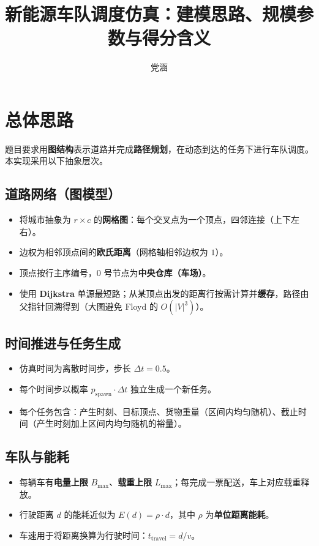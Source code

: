\documentclass[UTF8,a4paper]{ctexart}
\title{新能源车队调度仿真：建模思路、规模参数与得分含义}
\author{党涵}
\date{}
\begin{document}
\maketitle

\section{总体思路}

题目要求用\textbf{图结构}表示道路并完成\textbf{路径规划}，在动态到达的任务下进行车队调度。本实现采用以下抽象层次。

\subsection{道路网络（图模型）}
\begin{itemize}
  \item 将城市抽象为 $r\times c$ 的\textbf{网格图}：每个交叉点为一个顶点，四邻连接（上下左右）。
  \item 边权为相邻顶点间的\textbf{欧氏距离}（网格轴相邻边权为 $1$）。
  \item 顶点按行主序编号，$0$ 号节点为\textbf{中央仓库（车场）}。
  \item 使用 \textbf{Dijkstra} 单源最短路；从某顶点出发的距离行按需计算并\textbf{缓存}，路径由父指针回溯得到（大图避免 Floyd 的 $O(|V|^3)$）。
\end{itemize}

\subsection{时间推进与任务生成}
\begin{itemize}
  \item 仿真时间为离散时间步，步长 $\Delta t = 0.5$。
  \item 每个时间步以概率 $p_{\mathrm{spawn}} \cdot \Delta t$ 独立生成一个新任务。
  \item 每个任务包含：产生时刻、目标顶点、货物重量（区间内均匀随机）、截止时间（产生时刻加上区间内均匀随机的裕量）。
\end{itemize}

\subsection{车队与能耗}
\begin{itemize}
  \item 每辆车有\textbf{电量上限} $B_{\max}$、\textbf{载重上限} $L_{\max}$；每完成一票配送，车上对应载重释放。
  \item 行驶距离 $d$ 的能耗近似为 $E(d)=\rho\cdot d$，其中 $\rho$ 为\textbf{单位距离能耗}。
  \item 车速用于将距离换算为行驶时间：$t_{\mathrm{travel}} = d / v$。
\end{itemize}
\end{document}
